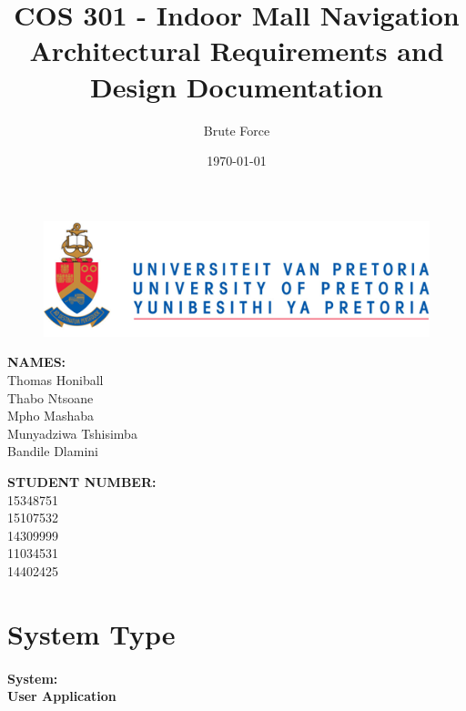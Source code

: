 \documentclass{article}
\title{COS 301 - Indoor Mall Navigation Architectural Requirements and Design Documentation}
\author{Brute Force}
\date{\today}
\begin{document}
	\maketitle
	
	\begin{figure}[!t]
		\includegraphics{up_logo.png}
	\end{figure}
	\begin{minipage}{0.4\textwidth}
		\begin{flushleft} \large
			\textbf{NAMES:}\\[0.4cm]
			Thomas Honiball\\
			Thabo Ntsoane\\
			Mpho Mashaba\\	
			Munyadziwa Tshisimba\\
			Bandile Dlamini
			
		\end{flushleft}
	\end{minipage}
	\begin{minipage}{0.4\textwidth}
		\begin{flushright} \large
			\textbf{STUDENT NUMBER:} \\[0.4cm]
			15348751\\ 	
			15107532\\		
			14309999\\		
			11034531\\	
			14402425
		\end{flushright}
	\end{minipage}
	
	\maketitle
	
	\pagebreak
	\tableofcontents
	\pagebreak
	
	
	
	\section{System Type}
	\paragraph{System: \\ User Application } 
\end{document}
